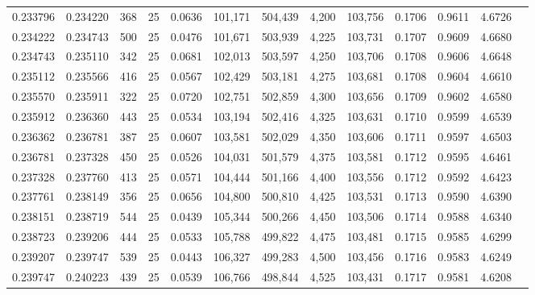\begin{tabular}{rrrrrrrrrrrrr}
0.233796 & 0.234220 &   368 &  25 &                                     0.0636 & 101,171 & 504,439 &   4,200 & 103,756 & 0.1706 & 0.9611 & 4.6726 \\
0.234222 & 0.234743 &   500 &  25 &                                     0.0476 & 101,671 & 503,939 &   4,225 & 103,731 & 0.1707 & 0.9609 & 4.6680 \\
0.234743 & 0.235110 &   342 &  25 &                                     0.0681 & 102,013 & 503,597 &   4,250 & 103,706 & 0.1708 & 0.9606 & 4.6648 \\
0.235112 & 0.235566 &   416 &  25 &                                     0.0567 & 102,429 & 503,181 &   4,275 & 103,681 & 0.1708 & 0.9604 & 4.6610 \\
0.235570 & 0.235911 &   322 &  25 &                                     0.0720 & 102,751 & 502,859 &   4,300 & 103,656 & 0.1709 & 0.9602 & 4.6580 \\
0.235912 & 0.236360 &   443 &  25 &                                     0.0534 & 103,194 & 502,416 &   4,325 & 103,631 & 0.1710 & 0.9599 & 4.6539 \\
0.236362 & 0.236781 &   387 &  25 &                                     0.0607 & 103,581 & 502,029 &   4,350 & 103,606 & 0.1711 & 0.9597 & 4.6503 \\
0.236781 & 0.237328 &   450 &  25 &                                     0.0526 & 104,031 & 501,579 &   4,375 & 103,581 & 0.1712 & 0.9595 & 4.6461 \\
0.237328 & 0.237760 &   413 &  25 &                                     0.0571 & 104,444 & 501,166 &   4,400 & 103,556 & 0.1712 & 0.9592 & 4.6423 \\
0.237761 & 0.238149 &   356 &  25 &                                     0.0656 & 104,800 & 500,810 &   4,425 & 103,531 & 0.1713 & 0.9590 & 4.6390 \\
0.238151 & 0.238719 &   544 &  25 &                                     0.0439 & 105,344 & 500,266 &   4,450 & 103,506 & 0.1714 & 0.9588 & 4.6340 \\
0.238723 & 0.239206 &   444 &  25 &                                     0.0533 & 105,788 & 499,822 &   4,475 & 103,481 & 0.1715 & 0.9585 & 4.6299 \\
0.239207 & 0.239747 &   539 &  25 &                                     0.0443 & 106,327 & 499,283 &   4,500 & 103,456 & 0.1716 & 0.9583 & 4.6249 \\
0.239747 & 0.240223 &   439 &  25 &                                     0.0539 & 106,766 & 498,844 &   4,525 & 103,431 & 0.1717 & 0.9581 & 4.6208 \\

\end{tabular}
